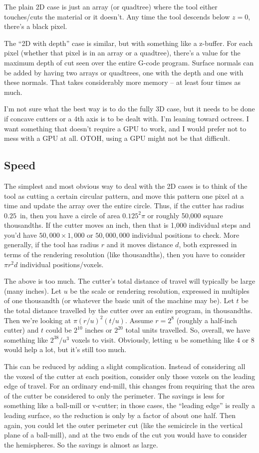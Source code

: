 \documentclass[titlepage,oneside,10pt]{article}
\begin{document}
The plain 2D case is just an array (or quadtree) where the tool either
touches/cuts the material or it doesn't. Any time the tool descends
below $z=0$, there's a black pixel.

The ``2D with depth'' case is similar, but with something like a
z-buffer. For each pixel (whether that pixel is in an array or a
quadtree), there's a value for the maximum depth of cut seen over the
entire G-code program. Surface normals can be added by having two
arrays or quadtrees, one with the depth and one with these
normals. That takes considerably more memory -- at least four times as
much.

I'm not sure what the best way is to do the fully 3D case, but it
needs to be done if concave cutters or a 4th axis is to be dealt
with. I'm leaning toward octrees. I want something that doesn't
require a GPU to work, and I would prefer not to mess with a GPU at
all. OTOH, using a GPU might not be that difficult.

\subsection{Speed}

The simplest and most obvious way to deal with the 2D cases is to
think of the tool as cutting a certain circular pattern, and move this
pattern one pixel at a time and update the array over the entire
circle. Thus, if the cutter has radius $0.25$~in, then you have a
circle of area $0.125^2\pi$ or roughly 50,000 square thousandths. If
the cutter moves an inch, then that is 1,000 individual steps and
you'd have $50,000\times 1,000$ or $50,000,000$ individual positions to
check. More generally, if the tool has radius $r$ and it moves
distance $d$, both expressed in terms of the rendering resolution
(like thousandths), then you have to consider $\pi r^2d$ individual
positions/voxels.

The above is too much. The cutter's total distance of travel will
typically be large (many inches). Let $u$ be the scale or rendering
resolution, expressed in multiples of one thousandth (or whatever the
basic unit of the machine may be). Let $t$ be the total distance
travelled by the cutter over an entire program, in thousandths. Then
we're looking at $\pi (r/u)^2 (t/u)$. Assume $r=2^8$ (roughly a
half-inch cutter) and $t$ could be $2^{10}$ inches or $2^{20}$ total
units travelled. So, overall, we have something like $2^{38}/u^3$
voxels to visit. Obviously, letting $u$ be something like 4 or 8 would
help a lot, but it's still too much.

This can be reduced by adding a slight complication. Instead
of considering all the voxesl of the cutter at each position, consider
only those voxels on the leading edge of travel. For an ordinary
end-mill, this changes from requiring that the area of the cutter be
considered to only the perimeter. The savings is less for something
like a ball-mill or v-cutter; in those cases, the ``leading edge'' is
really a leading surface, so the reduction is only by a factor of
about one half. Then again, you could let the outer perimeter cut
(like the semicircle in the vertical plane of a ball-mill), and at the
two ends of the cut you would have to consider the hemispheres. So the
savings is almost as large.
\end{document}
